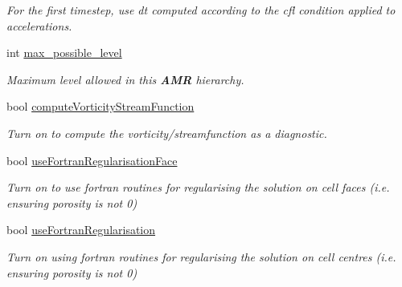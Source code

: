 \begin{DoxyCompactItemize}
\begin{DoxyCompactList}\small\item\em For the first timestep, use dt computed according to the cfl condition applied to accelerations. \end{DoxyCompactList}\item 
\mbox{\label{struct_mushy_layer_options_a6300001d03a88445ca0bb15989d837d9}} 
int \hyperlink{struct_mushy_layer_options_a6300001d03a88445ca0bb15989d837d9}{max\+\_\+possible\+\_\+level}
\begin{DoxyCompactList}\small\item\em Maximum level allowed in this \textbf{ A\+MR} hierarchy. \end{DoxyCompactList}\item 
\mbox{\label{struct_mushy_layer_options_a6fc1ebea368c338af3708e41560eeb0f}} 
bool \hyperlink{struct_mushy_layer_options_a6fc1ebea368c338af3708e41560eeb0f}{compute\+Vorticity\+Stream\+Function}
\begin{DoxyCompactList}\small\item\em Turn on to compute the vorticity/streamfunction as a diagnostic. \end{DoxyCompactList}\item 
bool \hyperlink{struct_mushy_layer_options_a4d2370260d6a49bf5a988f379592320c}{use\+Fortran\+Regularisation\+Face}
\begin{DoxyCompactList}\small\item\em Turn on to use fortran routines for regularising the solution on cell faces (i.\+e. ensuring porosity is not 0) \end{DoxyCompactList}\item 
\mbox{\label{struct_mushy_layer_options_a2a3357f2be7d8c6cd481578e59884ec1}} 
bool \hyperlink{struct_mushy_layer_options_a2a3357f2be7d8c6cd481578e59884ec1}{use\+Fortran\+Regularisation}
\begin{DoxyCompactList}\small\item\em Turn on using fortran routines for regularising the solution on cell centres (i.\+e. ensuring porosity is not 0) \end{DoxyCompactList}\item 
\mbox{\label{struct_mushy_layer_options_ac5ffd9d1d42b13f5eb03e11e581ba061}} 

\end{DoxyCompactItemize}
